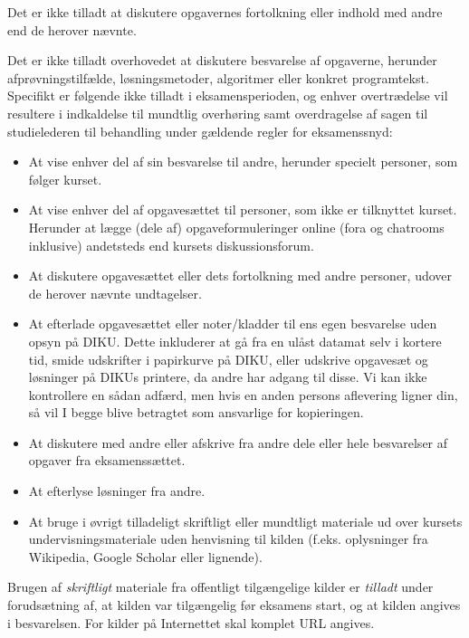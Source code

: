 Det er ikke tilladt at diskutere opgavernes fortolkning eller indhold med
andre end de herover nævnte.

Det er ikke tilladt overhovedet at diskutere besvarelse af opgaverne, herunder
afprøvningstilfælde, løsningsmetoder, algoritmer eller konkret programtekst.
Specifikt er følgende ikke tilladt i eksamensperioden, og enhver overtrædelse
vil resultere i indkaldelse til mundtlig overhøring samt overdragelse af sagen
til studielederen til behandling under gældende regler for eksamenssnyd:

\begin{itemize}

\item At vise enhver del af sin besvarelse til andre, herunder specielt
personer, som følger kurset.

\item At vise enhver del af opgavesættet til personer, som ikke er tilknyttet
kurset. Herunder at lægge (dele af) opgaveformuleringer online (fora og
chatrooms inklusive) andetsteds end kursets diskussionsforum.

\item At diskutere opgavesættet eller dets fortolkning med andre personer,
udover de herover nævnte undtagelser.

\item At efterlade opgavesættet eller noter/kladder til ens egen besvarelse
uden opsyn på DIKU. Dette inkluderer at gå fra en ulåst datamat selv i kortere
tid, smide udskrifter i papirkurve på DIKU, eller udskrive opgavesæt og
løsninger på DIKUs printere, da andre har adgang til disse. Vi kan ikke
kontrollere en sådan adfærd, men hvis en anden persons aflevering ligner din,
så vil I begge blive betragtet som ansvarlige for kopieringen.

\item At diskutere med andre eller afskrive fra andre dele eller hele
besvarelser af opgaver fra eksamenssættet.

\item At efterlyse løsninger fra andre.

\item At bruge i øvrigt tilladeligt skriftligt eller mundtligt materiale ud
over kursets undervisningsmateriale uden henvisning til kilden (f.eks.
oplysninger fra Wikipedia, Google Scholar eller lignende).

\end{itemize}

Brugen af \emph{skriftligt} materiale fra offentligt tilgængelige kilder er
\emph{tilladt} under forudsætning af, at kilden var tilgængelig før eksamens
start, og at kilden angives i besvarelsen. For kilder på Internettet skal
komplet URL angives.

